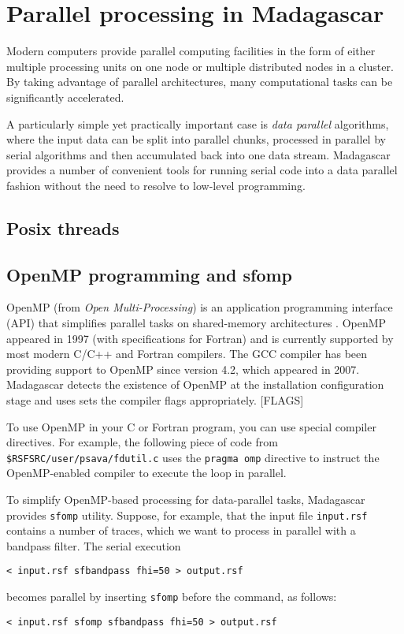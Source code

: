 \chapter{Parallel processing in Madagascar}

Modern computers provide parallel computing facilities in the form of
either multiple processing units on one node or multiple distributed
nodes in a cluster. By taking advantage of parallel architectures,
many computational tasks can be significantly accelerated.

A particularly simple yet practically important case is \emph{data
  parallel} algorithms, where the input data can be split into
parallel chunks, processed in parallel by serial algorithms and then
accumulated back into one data stream. Madagascar provides a number of
convenient tools for running serial code into a data parallel fashion
without the need to resolve to low-level programming.

\section{Posix threads}

\section{OpenMP programming and sfomp}

OpenMP (from \emph{Open Multi-Processing}) is an application
programming interface (API) that simplifies parallel tasks on
shared-memory architectures \cite[]{chandra,chapman}. OpenMP appeared
in 1997 (with specifications for Fortran) and is currently supported
by most modern C/C++ and Fortran compilers. The GCC compiler has been
providing support to OpenMP since version 4.2, which appeared in
2007. Madagascar detects the existence of OpenMP at the installation
configuration stage and uses sets the compiler flags appropriately. [FLAGS]

To use OpenMP in your C or Fortran program, you can use special
compiler directives. For example, the following piece of code from
\texttt{\$RSFSRC/user/psava/fdutil.c} uses the \texttt{pragma omp}
directive to instruct the OpenMP-enabled compiler to execute the loop
in parallel.

\lstset{language=c,numbers=left,numberstyle=\tiny,showstringspaces=false}


To simplify OpenMP-based processing for data-parallel tasks,
Madagascar provides \texttt{sfomp} utility. Suppose, for example, that
the input file \texttt{input.rsf} contains a number of traces, which
we want to process in parallel with a bandpass filter. The serial execution
\begin{verbatim}
< input.rsf sfbandpass fhi=50 > output.rsf
\end{verbatim}
becomes parallel by inserting \texttt{sfomp} before the command, as follows:
\begin{verbatim}
< input.rsf sfomp sfbandpass fhi=50 > output.rsf
\end{verbatim}

